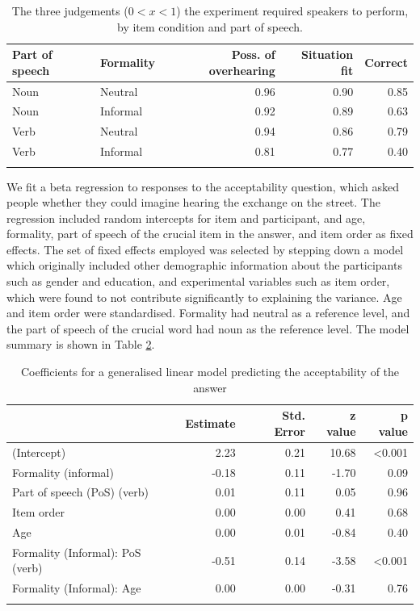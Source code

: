\documentclass[output=paper,colorlinks,citecolor=brown]{langscibook}
\begin{document}
\begin{table}[ht]
	\centering
	\begin{tabular}{llrrr}
		\lsptoprule
		Part of speech & Formality & Poss. of overhearing & Situation fit & Correct \\ 
		\midrule
		Noun & Neutral & 0.96 & 0.90 & 0.85 \\ 
		Noun & Informal & 0.92 & 0.89 & 0.63 \\ 
		Verb & Neutral & 0.94 & 0.86 & 0.79 \\ 
		Verb & Informal & 0.81 & 0.77 & 0.40 \\ 
		\lspbottomrule
	\end{tabular}
	\caption{The three judgements ($0<x<1$) the experiment required speakers to perform, by item condition and part of speech.}
	\label{tab:mean-cond}
\end{table}

We fit a beta regression to responses to the acceptability question, which asked people whether they could imagine hearing the exchange on the street. The regression included random intercepts for item and participant, and age, formality, part of speech of the crucial item in the answer, and item order as fixed effects. The set of fixed effects employed was selected by stepping down a model which originally included other demographic information about the participants such as gender and education, and experimental variables such as item order, which were found to not contribute significantly to explaining the variance. Age and item order were standardised. Formality had neutral as a reference level, and the part of speech of the crucial word had noun as the reference level. The model summary is shown in Table \ref{tab:coefficients}.

\begin{table}[ht]
	\centering
	\begin{tabular}{lrrrr}
		\lsptoprule
		& Estimate & Std. Error & z value & p value \\ 
		\midrule
		(Intercept) & 2.23 & 0.21 & 10.68 & <0.001 \\ 
		Formality (informal) & -0.18 & 0.11 & -1.70 & 0.09 \\ 
		Part of speech (PoS) (verb) & 0.01 & 0.11 & 0.05 & 0.96 \\ 
		Item order & 0.00 & 0.00 & 0.41 & 0.68 \\ 
		Age & 0.00 & 0.01 & -0.84 & 0.40 \\ 
		Formality (Informal): PoS (verb) & -0.51 & 0.14 & -3.58 & <0.001 \\ 
		Formality (Informal): Age & 0.00 & 0.00 & -0.31 & 0.76\\ 
		\lspbottomrule
	\end{tabular}
	\caption{Coefficients for a generalised linear model predicting the acceptability of the answer}
	\label{tab:coefficients}
\end{table}
\end{document}
